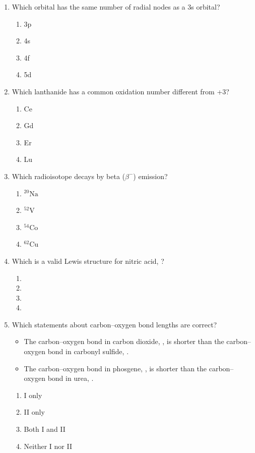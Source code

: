 \documentclass[twocolumn, 10pt]{article}
\begin{document}
\begin{enumerate}
    \item Which orbital has the same number of radial nodes as a 3s orbital?
    \begin{enumerate}
        \item 3p
        \item 4s
        \item 4f
        \item 5d
    \end{enumerate}

    \item Which lanthanide has a common oxidation number different from +3?
    \begin{enumerate}
        \item Ce
        \item Gd
        \item Er
        \item Lu
    \end{enumerate}

    \item Which radioisotope decays by beta ($\beta^-$) emission?
    \begin{enumerate}
        \item $^{20}\text{Na}$
        \item $^{52}\text{V}$
        \item $^{54}\text{Co}$
        \item $^{62}\text{Cu}$
    \end{enumerate}

    \item Which is a valid Lewis structure for nitric acid, ?
    \begin{enumerate}
        \item {}
        \item {}
        \item {}
        \item {}
    \end{enumerate}

    \item Which statements about carbon--oxygen bond lengths are correct?
    \begin{itemize}
        \item[I.] The carbon--oxygen bond in carbon dioxide, , is shorter than the carbon--oxygen bond in carbonyl sulfide, .
        \item[II.] The carbon--oxygen bond in phosgene, , is shorter than the carbon--oxygen bond in urea, .
    \end{itemize}
    \begin{enumerate}
        \item I only
        \item II only
        \item Both I and II
        \item Neither I nor II
    \end{enumerate}


\end{enumerate}
\end{document}

